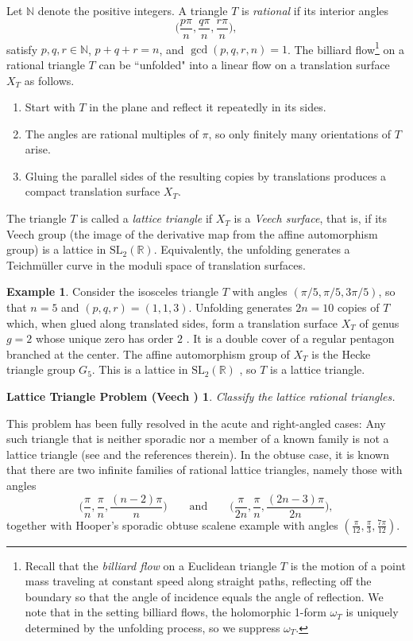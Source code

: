 \documentclass[12pt]{amsart}
\newtheorem*{MainProblem}{Lattice Triangle Problem (Veech \cite{Veech1})}
\theoremstyle{definition}
\newtheorem*{example}{Example}
\newcommand{\R}{\mathbb{R}}
\newcommand{\N}{\mathbb{N}}
\newcommand{\SL}{\mathrm{SL}}
\begin{document}
Let $\N$ denote the positive integers.  A triangle $T$ is \emph{rational} if its interior angles
\[
\Big(\frac{p\pi}{n}, \frac{q\pi}{n}, \frac{r\pi}{n}\Big),
\]
satisfy $p, q, r \in {\N}$, $p+q+r=n$, and $\gcd(p, q, r, n)=1$.  The billiard flow\footnote{Recall that the \emph{billiard flow} on a Euclidean triangle $T$ is the motion of a point mass traveling at constant speed along straight paths, reflecting off the boundary so that the angle of incidence equals the angle of reflection.  We note that in the setting billiard flows, the holomorphic 1-form $\omega_T$ is uniquely determined by the unfolding process, so we suppress $\omega_T$.} on a rational triangle $T$ can be ``unfolded" into a linear flow on a translation surface ${X_T}$ as follows.
\begin{enumerate}
    \item Start with $T$ in the plane and reflect it repeatedly in its sides.
    \item The angles are rational multiples of $\pi$, so only finitely many orientations of $T$ arise.
    \item Gluing the parallel sides of the resulting copies by translations produces a compact translation surface $X_T$.
\end{enumerate}
The triangle $T$ is called a \emph{lattice triangle} if ${X_T}$ is a \emph{Veech surface}, that is, if its Veech group (the image of the derivative map from the affine automorphism group) is a lattice in $\SL_2(\R)$.  Equivalently, the unfolding generates a Teichm\"uller curve in the moduli space of translation surfaces.

\begin{example}
Consider the isosceles triangle $T$ with angles $(\pi/5, \pi/5, 3\pi/5)$, so that $n=5$ and $(p,q,r) = (1,1,3)$.  Unfolding generates $2n = 10$ copies of $T$ which, when glued along translated sides, form a translation surface ${X_T}$ of genus $g=2$ whose unique zero has order $2$ \cite{McM, Veech1}.  It is a double cover of a regular pentagon branched at the center.  The affine automorphism group of $X_T$ is the Hecke triangle group $G_5$.  This is a lattice in $\SL_2(\R)$ \cite{Veech1, Veech2}, so $T$ is a lattice triangle.
\end{example}


\begin{MainProblem}
Classify the lattice rational triangles.
\end{MainProblem}

This problem has been fully resolved in the acute and right-angled cases:  Any such triangle that is neither sporadic nor a member of a known family is not a lattice triangle (see \cite{Hub} and the references therein).  In the obtuse case, it is known \cite{LNZ} that there are two infinite families of rational lattice triangles, namely those with angles
\[
\Big(\frac{\pi}{n},\frac{\pi}{n},\frac{(n-2)\pi}{n}\Big) \qquad\text{and}\qquad
\Big(\frac{\pi}{2n},\frac{\pi}{n},\frac{(2n-3)\pi}{2n}\Big),
\]
together with Hooper's sporadic obtuse scalene example \cite{Hooper} with angles $(\frac{\pi}{12},\frac{\pi}{3},\frac{7\pi}{12})$.
\end{document}
